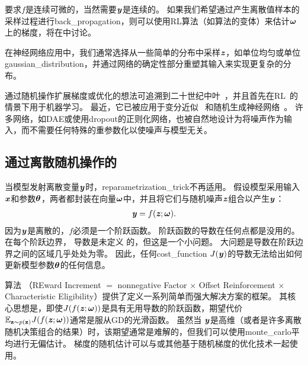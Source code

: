 要求$f$是连续可微的，当然需要$\boldsymbol{\mathit{y}}$是连续的。
如果我们希望通过产生离散值样本的采样过程进行\gls{back_propagation}，则可以使用\gls{RL}算法（如算法\citep{Williams-1992}的变体）来估计$\boldsymbol{\omega}$上的梯度，将在中讨论。

在神经网络应用中，我们通常选择从一些简单的分布中采样$\boldsymbol{\mathit{z}}$，如单位均匀或单位\gls{gaussian_distribution}，并通过网络的确定性部分重塑其输入来实现更复杂的分布。

通过随机操作扩展梯度或优化的想法可追溯到二十世纪中叶~\citep{Price-1958,Bonnet-1964}，并且首先在\gls{RL}~\citep{Williams-1992}的情景下用于机器学习。
最近，它已被应用于变分近似~\citep{Opper+Archambeau-2009} 和随机生成神经网络~\citep{bengio2013estimating,Kingma-arxiv2013,Kingma+Welling-arxiv2014,Kingma+Welling-ICLR2014,Rezende-et-al-ICML2014,Goodfellow-et-al-NIPS2014-small}。
许多网络，如\gls{DAE}或使用\gls{dropout}的正则化网络，也被自然地设计为将噪声作为输入，而不需要任何特殊的重参数化以使噪声与模型无关。


\subsection{通过离散随机操作的}
\label{sec:back_propagating_through_discrete_stochastic_operations}

当模型发射离散变量$\boldsymbol{\mathit{y}}$时，\gls{reparametrization_trick}不再适用。
假设模型采用输入$\boldsymbol{\mathit{x}}$和参数$\boldsymbol{\theta}$，两者都封装在向量$\boldsymbol{\omega}$中，并且将它们与随机噪声$\boldsymbol{\mathit{z}}$组合以产生$\boldsymbol{\mathit{y}}$：
\begin{align}
 \boldsymbol{\mathit{y}} = f(\boldsymbol{\mathit{z}};\boldsymbol{\omega}).
\end{align}
因为$\boldsymbol{\mathit{y}}$是离散的，$f$必须是一个阶跃函数。
阶跃函数的导数在任何点都是没用的。
在每个阶跃边界， 导数是未定义 的，但这是一个小问题。
大问题是导数在阶跃边界之间的区域几乎处处为零。
因此，任何\gls{cost_function} $J(\boldsymbol{\mathit{y}})$的导数无法给出如何更新模型参数$\boldsymbol{\theta}$的任何信息。

算法 （REward Increment $=$ nonnegative Factor $\times$ Offset Reinforcement $\times$ Characteristic Eligibility）提供了定义一系列简单而强大解决方案的框架\citep{Williams-1992}。
其核心思想是，即使$J(f(\boldsymbol{\mathit{z}};\boldsymbol{\omega}))$是具有无用导数的阶跃函数，期望代价$\mathbb{E}_{\mathbf{z} \sim p(\mathbf{z})} J(f(\boldsymbol{\mathit{z}};\boldsymbol{\omega}))$通常是服从\gls{GD}的光滑函数。
虽然当 $\boldsymbol{\mathit{y}}$是高维（或者是许多离散随机决策组合的结果）时，该期望通常是难解的，但我们可以使用\gls{monte_carlo}平均进行无偏估计。
梯度的随机估计可以与或其他基于随机梯度的优化技术一起使用。


